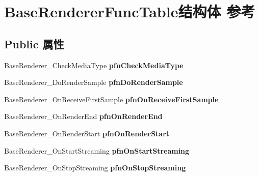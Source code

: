 \hypertarget{struct_base_renderer_func_table}{}\section{Base\+Renderer\+Func\+Table结构体 参考}
\label{struct_base_renderer_func_table}
\subsection*{Public 属性}
\begin{DoxyCompactItemize}
\item 
\mbox{\label{struct_base_renderer_func_table_a9b268ed36cef9370a725930cdd868e2c}} 
Base\+Renderer\+\_\+\+Check\+Media\+Type {\bfseries pfn\+Check\+Media\+Type}
\item 
\mbox{\label{struct_base_renderer_func_table_a18da400bcd6f9a8e4bf6b2f4b7fa515f}} 
Base\+Renderer\+\_\+\+Do\+Render\+Sample {\bfseries pfn\+Do\+Render\+Sample}
\item 
\mbox{\label{struct_base_renderer_func_table_a773adc14c801ad474f084e1df8839014}} 
Base\+Renderer\+\_\+\+On\+Receive\+First\+Sample {\bfseries pfn\+On\+Receive\+First\+Sample}
\item 
\mbox{\label{struct_base_renderer_func_table_a38c8d4f116adefc63e3b028f3311c1e3}} 
Base\+Renderer\+\_\+\+On\+Render\+End {\bfseries pfn\+On\+Render\+End}
\item 
\mbox{\label{struct_base_renderer_func_table_ab7c139b8ff422813102b4dd53dd49292}} 
Base\+Renderer\+\_\+\+On\+Render\+Start {\bfseries pfn\+On\+Render\+Start}
\item 
\mbox{\label{struct_base_renderer_func_table_a6eb1630133e849ce03d4865526eaf47b}} 
Base\+Renderer\+\_\+\+On\+Start\+Streaming {\bfseries pfn\+On\+Start\+Streaming}
\item 
\mbox{\label{struct_base_renderer_func_table_ab133ac3dc1b84f613219b7c8fb6aa691}} 
Base\+Renderer\+\_\+\+On\+Stop\+Streaming {\bfseries pfn\+On\+Stop\+Streaming}

\end{DoxyCompactItemize}
